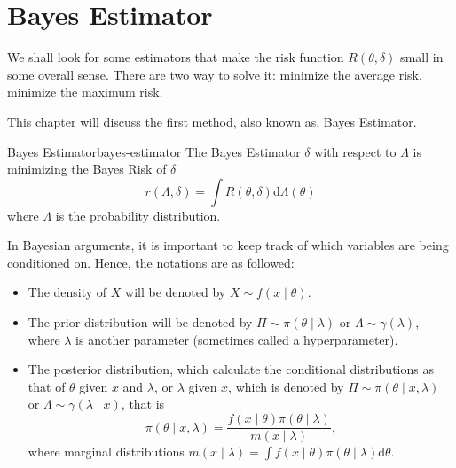 \chapter{Bayes Estimator}

We shall look for some estimators that make the risk function $R\left(\theta,\delta\right)$ small in some overall sense. There are two way to solve it: minimize the average risk, minimize the maximum risk.

This chapter will discuss the first method, also known as, Bayes Estimator.

\begin{definition}{Bayes Estimator}{bayes-estimator}
    The Bayes Estimator $\delta$ with respect to $\Lambda$ is minimizing the Bayes Risk of $\delta$
    \begin{equation}
        r\left(\Lambda, \delta\right)=\int R\left(\theta, \delta\right) \mathrm{d} \Lambda\left(\theta\right)
    \end{equation}
    where $\Lambda$ is the probability distribution.
\end{definition}

In Bayesian arguments, it is important to keep track of which variables are being conditioned on. Hence, the notations are as followed:
\begin{itemize}
    \item The density of $X$ will be denoted by $X \sim f\left(x \mid \theta\right)$.
    \item The prior distribution will be denoted by $\Pi \sim \pi\left(\theta \mid \lambda\right)$ or $\Lambda \sim \gamma\left(\lambda\right)$, where $\lambda$ is another parameter (sometimes called a hyperparameter).
    \item The posterior distribution, which calculate the conditional distributions as that of $\theta$ given $x$ and $\lambda$, or $\lambda$ given $x$, which is denoted by $\Pi \sim \pi\left(\theta \mid x, \lambda\right)$ or $\Lambda \sim \gamma\left(\lambda \mid x\right)$, that is
    \begin{equation}
        \pi\left(\theta \mid x, \lambda\right) = \frac{f\left(x \mid \theta\right) \pi\left(\theta \mid \lambda\right)}{m\left(x \mid \lambda\right)},
    \end{equation}
    where marginal distributions $m\left(x \mid \lambda\right) = \int f\left(x \mid \theta\right) \pi\left(\theta \mid \lambda\right) \mathrm{d} \theta$.
\end{itemize}

